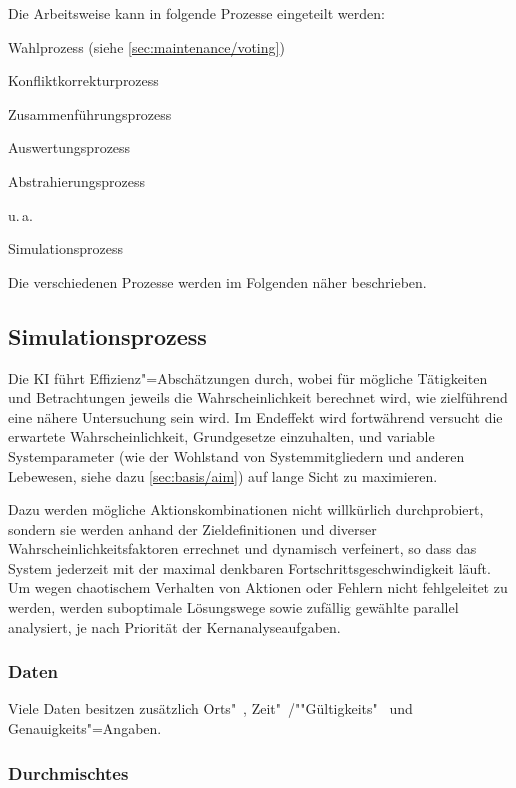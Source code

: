 Die Arbeitsweise kann in folgende Prozesse eingeteilt werden:
\medskip
\begin{compactitem}
\item Wahlprozess (siehe \vref{sec:maintenance/voting})
\item Konfliktkorrekturprozess
\item Zusammenführungsprozess
\item Auswertungsprozess
\item Abstrahierungsprozess
\item u.\,a.
\item Simulationsprozess
\end{compactitem}
\medskip

Die verschiedenen Prozesse werden im Folgenden näher beschrieben.

\subsection{Simulationsprozess}\label{sec:ki/simulation}

Die KI führt Effizienz"=Abschätzungen durch, wobei für mögliche Tätigkeiten und Betrachtungen jeweils die Wahrscheinlichkeit berechnet wird, wie zielführend eine nähere Untersuchung sein wird. Im Endeffekt wird fortwährend versucht die erwartete Wahrscheinlichkeit, Grundgesetze einzuhalten, und variable Systemparameter (wie der Wohlstand von Systemmitgliedern und anderen Lebewesen, siehe dazu \vref{sec:basis/aim}) auf lange Sicht zu maximieren.

Dazu werden mögliche Aktionskombinationen nicht willkürlich durchprobiert, sondern sie werden anhand der Zieldefinitionen und diverser Wahrscheinlichkeitsfaktoren errechnet und dynamisch verfeinert, so dass das System jederzeit mit der maximal denkbaren Fortschrittsgeschwindigkeit läuft. Um wegen chaotischem Verhalten von Aktionen oder Fehlern nicht fehlgeleitet zu werden, werden suboptimale Lösungswege sowie zufällig gewählte parallel analysiert, je nach Priorität der Kernanalyseaufgaben.

\subsubsection{Daten}

Viele Daten besitzen zusätzlich Orts"~, Zeit"~/""Gültigkeits"~ und Genauigkeits"=Angaben.

\subsubsection{Durchmischtes}

